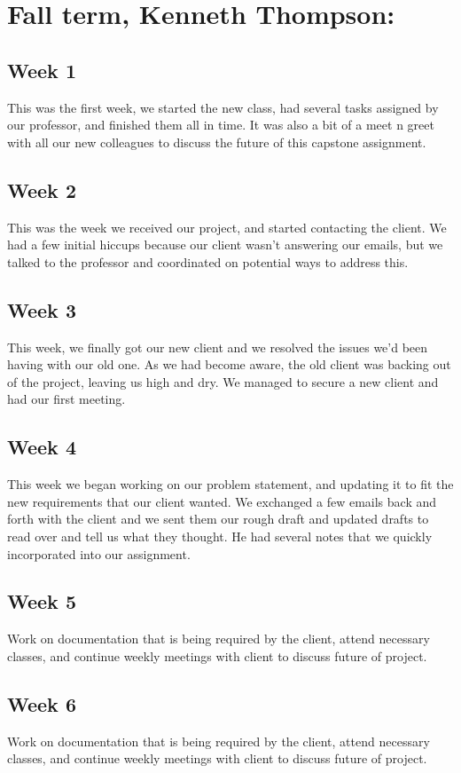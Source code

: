 \documentclass{article}
\begin{document}
\section{Fall term, Kenneth Thompson:}
\subsection{Week 1} 
This was the first week, we started the new class, had several tasks assigned by our professor, and finished them all in time. It was also a bit of a meet n greet with all our new colleagues to discuss the future of this capstone assignment.
\subsection{Week 2} 
This was the week we received our project, and started contacting the client. We had a few initial hiccups because our client wasn’t answering our emails, but we talked to the professor and coordinated on potential ways to address this.
\subsection{Week 3} 
This week, we finally got our new client and we resolved the issues we’d been having with our old one. As we had become aware, the old client was backing out of the project, leaving us high and dry. We managed to secure a new client and had our first meeting.
\subsection{Week 4} 
This week we began working on our problem statement, and updating it to fit the new requirements that our client wanted. We exchanged a few emails back and forth with the client and we sent them our rough draft and updated drafts to read over and tell us what they thought. He had several notes that we quickly incorporated into our assignment.
\subsection{Week 5} 
Work on documentation that is being required by the client, attend necessary classes, and continue weekly meetings with client to discuss future of project.
\subsection{Week 6} 
Work on documentation that is being required by the client, attend necessary classes, and continue weekly meetings with client to discuss future of project.
\end{document}
